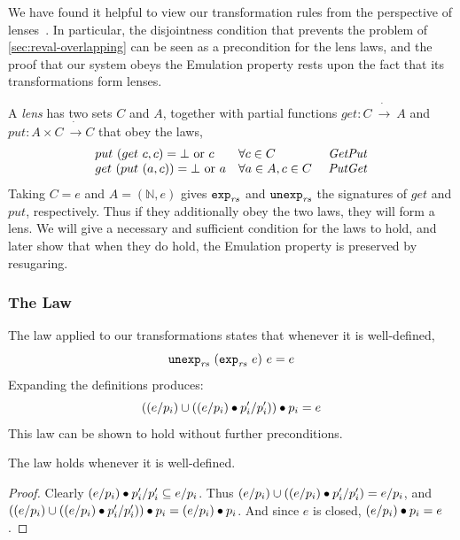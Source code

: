 We have found it helpful to view our transformation rules from the
perspective of lenses~\cite{fgkps:comb-bidir-tree-trans}. In
particular, the disjointness condition that prevents the 
problem of \cref{sec:reval-overlapping} can be seen as a precondition for the
lens laws, and the proof that our system obeys the Emulation property
rests upon the fact that its transformations form lenses.

A \emph{lens} has two sets $C$ and $A$, together with partial
functions $get : C\ \dot{\to}\ A$ and $put : A \times
C\ \dot{\to} C$ that obey the laws,
\[\begin{array}{lllll}
put\ (get\ c, c) = \bot \text{ or } c
  & \forall c \in C
  & \text{ \emph{GetPut}} \\
get\ (put\ (a, c)) = \bot \text{ or } a
  & \forall a \in A, c \in C
  & \text{ \emph{PutGet}}
\end{array}\]
Taking $C = e$ and $A = (\mathbb{N}, e)$ gives $\texttt{exp}_{\mathit{rs}}$ and
$\textnormal{\texttt{unexp}}_{\mathit{rs}}$ the signatures of $get$ and $put$,
respectively. Thus if they additionally obey the two laws, they will
form a lens. We will give a necessary and sufficient condition for the
laws to hold, and later show that when they do hold, the Emulation
property is preserved by resugaring.

\subsubsection{The {\Getput} Law}
\label{sec:reval-getput}
The {\Getput} law applied to our transformations states that whenever it
is well-defined,
\[ \texttt{unexp}_{\mathit{rs}}\ {(\texttt{exp}_{\mathit{rs}}\ {e})}\ {e} = e \]
Expanding the definitions produces:
\[ ((e / p_i) \cup ((e / p_i) \bullet p_i' / p_i')) \bullet p_i = e \]
This law can be shown to hold without further preconditions.
\begin{lemma} The {\Getput} law holds whenever it is well-defined.
\end{lemma}
\begin{proof}
Clearly $(e / p_i) \bullet p_i' / p_i' \subseteq e / p_i$.
Thus $(e / p_i) \cup ((e / p_i) \bullet p_i' / p_i')
 = e / p_i$,
and $((e / p_i) \cup ((e / p_i) \bullet p_i' / p_i')) \bullet p_i
 = (e / p_i) \bullet p_i$.
And since $e$ is closed, $(e / p_i) \bullet p_i = e$.
\end{proof}


